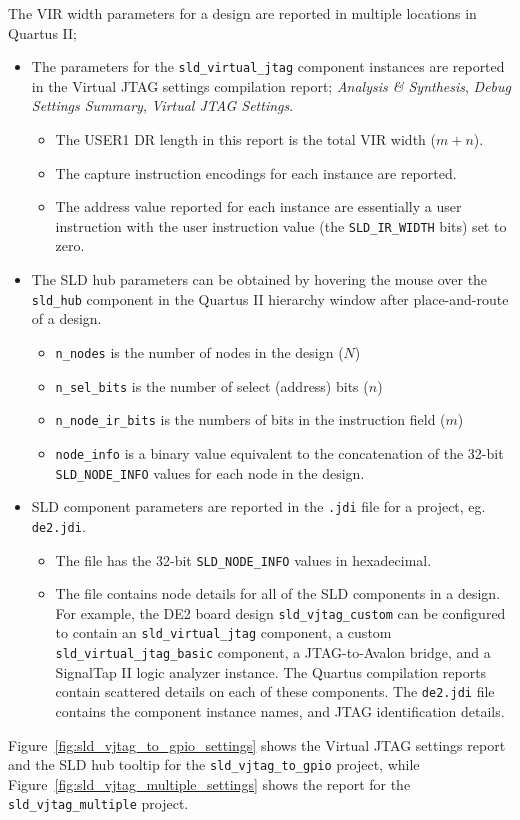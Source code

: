 \documentclass[10pt,twoside]{article}
\begin{document}
The VIR width parameters for a design are reported in multiple locations
in Quartus II;
%
\begin{itemize}
\item The parameters for the \verb+sld_virtual_jtag+
component instances are reported in the Virtual JTAG settings 
compilation report; {\em Analysis \& Synthesis}, {\em Debug Settings Summary},
{\em Virtual JTAG Settings}. 
%
\begin{itemize}
\item The USER1 DR length in this report is the total VIR width ($m+n$).
\item The capture instruction encodings for each instance are reported.
\item The address value reported for each instance are essentially a user
instruction with the user instruction value (the \verb+SLD_IR_WIDTH+ bits)
set to zero.
\end{itemize}
%
\item The SLD hub parameters can be obtained by hovering the mouse over
the \verb+sld_hub+ component in the Quartus II hierarchy window after
place-and-route of a design.
%
\begin{itemize}
\item \verb+n_nodes+ is the number of nodes in the design ($N$)
\item \verb+n_sel_bits+ is the number of select (address) bits ($n$)
\item \verb+n_node_ir_bits+ is the numbers of bits in the instruction field ($m$)
\item \verb+node_info+ is a binary value equivalent to the concatenation of
the 32-bit \verb+SLD_NODE_INFO+ values for each node in the design.
\end{itemize}
%
\item SLD component parameters are reported in the \verb+.jdi+ file for a 
project, eg. \verb+de2.jdi+.
%
\begin{itemize}
\item The file has the 32-bit \verb+SLD_NODE_INFO+ values in hexadecimal.
\item The file contains node details for all of the SLD components in a
design. For example, the DE2 board design \verb+sld_vjtag_custom+ can be
configured to contain an
\verb+sld_virtual_jtag+ component, a custom 
\verb+sld_virtual_jtag_basic+ component, a JTAG-to-Avalon bridge,
and a SignalTap II logic analyzer instance. The Quartus compilation reports
contain scattered details on each of these components. The \verb+de2.jdi+
file contains the component instance names, and JTAG identification details.
\end{itemize}
%
\end{itemize}
%
Figure~\ref{fig:sld_vjtag_to_gpio_settings} shows the Virtual JTAG
settings report and the SLD hub tooltip for the \verb+sld_vjtag_to_gpio+ 
project, while Figure~\ref{fig:sld_vjtag_multiple_settings}
shows the report for the \verb+sld_vjtag_multiple+ project.
\end{document}
